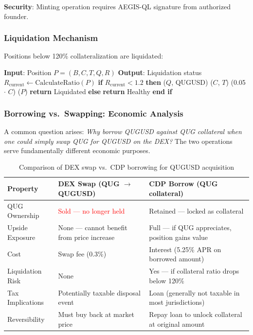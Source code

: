 \documentclass[11pt,a4paper]{article}
\begin{document}
\textbf{Security}: Minting operation requires AEGIS-QL signature from authorized founder.

\subsubsection{Liquidation Mechanism}

Positions below 120\% collateralization are liquidated:

\begin{algorithm}[H]
\caption{Liquidation Process}
\begin{algorithmic}[1]
\State \textbf{Input}: Position $P = (B, C, T, Q, R)$
\State \textbf{Output}: Liquidation status
\State
\State $R_{\text{current}} \leftarrow \text{CalculateRatio}(P)$
\State
\State \textbf{if} $R_{\text{current}} < 1.2$ \textbf{then}
\State \quad {}($Q$, QUGUSD) 
\State \quad {}($C$, $T$) 
\State \quad {}(0.05 $\cdot$ $C$) 
\State \quad {}($P$)
\State \quad \textbf{return} Liquidated
\State \textbf{else}
\State \quad \textbf{return} Healthy
\State \textbf{end if}
\end{algorithmic}
\end{algorithm}

\subsubsection{Borrowing vs.\ Swapping: Economic Analysis}

A common question arises: \textit{Why borrow QUGUSD against QUG collateral when one could simply swap QUG for QUGUSD on the DEX?} The two operations serve fundamentally different economic purposes.

\begin{table}[h]
\centering
\begin{tabular}{@{}p{3.5cm}p{5.5cm}p{5.5cm}@{}}
\toprule
\textbf{Property} & \textbf{DEX Swap (QUG $\to$ QUGUSD)} & \textbf{CDP Borrow (QUG collateral)} \\ \midrule
QUG Ownership & \textcolor{red}{Sold — no longer held} & \textcolor{green!60!black}{Retained — locked as collateral} \\
Upside Exposure & None — cannot benefit from price increase & Full — if QUG appreciates, position gains value \\
Cost & Swap fee (0.3\%) & Interest (5.25\% APR on borrowed amount) \\
Liquidation Risk & None & Yes — if collateral ratio drops below 120\% \\
Tax Implications & Potentially taxable disposal event & Loan (generally not taxable in most jurisdictions) \\
Reversibility & Must buy back at market price & Repay loan to unlock collateral at original amount \\
\bottomrule
\end{tabular}
\caption{Comparison of DEX swap vs.\ CDP borrowing for QUGUSD acquisition}
\label{tab:borrow_vs_swap}
\end{table}
\end{document}
